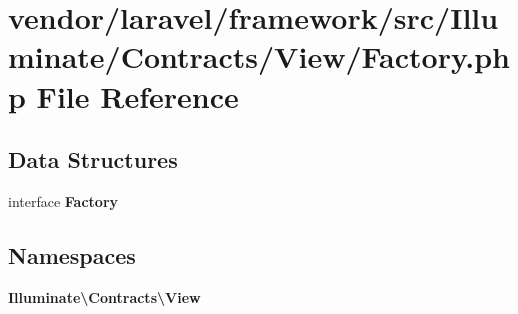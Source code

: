 \section{vendor/laravel/framework/src/\+Illuminate/\+Contracts/\+View/\+Factory.php File Reference}
\label{laravel_2framework_2src_2_illuminate_2_contracts_2_view_2_factory_8php}
\subsection*{Data Structures}
\begin{DoxyCompactItemize}
\item 
interface {\bf Factory}
\end{DoxyCompactItemize}
\subsection*{Namespaces}
\begin{DoxyCompactItemize}
\item 
 {\bf Illuminate\textbackslash{}\+Contracts\textbackslash{}\+View}
\end{DoxyCompactItemize}
